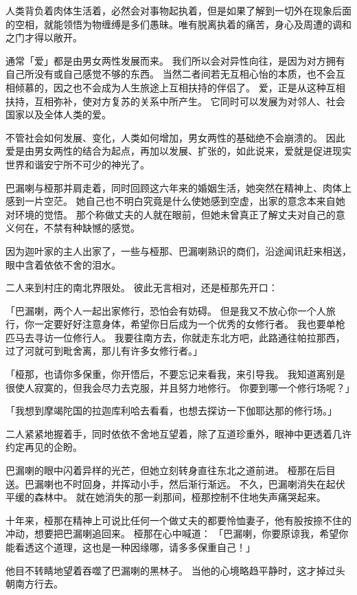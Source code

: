 \documentclass[twoside,openany]{book}
\begin{document}
人类背负着肉体生活着，必然会对事物起执着，但是如果了解到一切外在现象后面的空相，就能领悟为物缠缚是多们愚昧。唯有脱离执着的痛苦，身心及周遭的调和之门才得以敞开。

通常「爱」都是由男女两性发展而来。
我们所以会对异性向往，是因为对方拥有自己所没有或自己感觉不够的东西。
当然二者间若无互相心怡的本质，也不会互相倾慕的，因之也不会成为人生旅途上互相扶持的伴侣了。
爱，正是从这种互相扶持，互相弥补，使对方复苏的关系中所产生。
它同时可以发展为对邻人、社会国家以及全体人类的爱。

不管社会如何发展、变化，人类如何增加，男女两性的基础绝不会崩溃的。
因此爱是由男女两性的结合为起点，再加以发展、扩张的，如此说来，爱就是促进现实世界和谐安宁所不可少的神光了。

巴漏喇与桠那并肩走着，同时回顾这六年来的婚姻生活，她突然在精神上、肉体上感到一片空茫。
她自己也不明白究竟是什么使她感到空虚，出家的意念本来自她对环境的觉悟。
那个称做丈夫的人就在眼前，但她未曾真正了解丈夫对自己的意义何在，不禁有种缺憾的感觉。

因为迦叶家的主人出家了，一些与桠那、巴漏喇熟识的商们，沿途闻讯赶来相送，眼中含着依依不舍的泪水。

二人来到村庄的南北界限处。
彼此无言相对，还是桠那先开口：

「巴漏喇，两个人一起出家修行，恐怕会有妨碍。
但是我又不放心你一个人旅行，你一定要好好注意身体，希望你日后成为一个优秀的女修行者。
我也要单枪匹马去寻访一位修行人。
我要往南方去，你就走东北方吧，此路通往帕拉那西，过了河就可到毗舍离，那儿有许多女修行者。」

「桠那，也请你多保重，你开悟后，不要忘记来看我，来引导我。
我知道离别是很使人寂寞的，但我会尽力去克服，并且努力地修行。
你要到哪一个修行场呢？」

「我想到摩竭陀国的拉迦库利哈去看看，也想去探访一下伽耶达那的修行场。」

二人紧紧地握着手，同时依依不舍地互望着，除了互道珍重外，眼神中更透着几许约定再见的企盼。

巴漏喇的眼中闪着异样的光芒，但她立刻转身直往东北之道前进。
桠那在后目送。巴漏喇也不时回身，并挥动小手，然后渐行渐远。
不久，巴漏喇消失在起伏平缓的森林中。
就在她消失的那一刹那间，桠那控制不住地失声痛哭起来。

十年来，桠那在精神上可说比任何一个做丈夫的都要怜恤妻子，他有股按捺不住的冲动，想要把巴漏喇追回来。
桠那在心中喊道：
「巴漏喇，你要原谅我，希望你能看透这个道理，这也是一种因缘哪，请多多保重自己！」

他目不转睛地望着吞噬了巴漏喇的黑林子。
当他的心境略趋平静时，这才掉过头朝南方行去。
\end{document}
